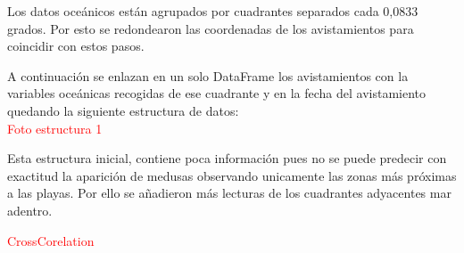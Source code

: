Los datos oceánicos están agrupados por cuadrantes separados cada 0,0833 grados. Por esto se redondearon las coordenadas de los avistamientos para coincidir con estos pasos. 

A continuación se enlazan en un solo DataFrame los avistamientos con la variables oceánicas recogidas de ese cuadrante y en la fecha del avistamiento quedando la siguiente estructura de datos:\\
\textcolor{red}{Foto estructura 1}

Esta estructura inicial, contiene poca información pues no se puede predecir con exactitud la aparición de medusas observando unicamente las zonas más próximas a las playas. Por ello se añadieron más lecturas de los cuadrantes adyacentes mar adentro.


\textcolor{red}{CrossCorelation}

